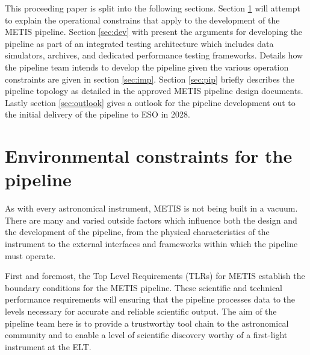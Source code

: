 \documentclass[a4paper]{spie}  %
\begin{document}
This proceeding paper is split into the following sections. Section \ref{sec:env} will attempt to explain the operational constrains that apply to the development of the METIS pipeline. Section \ref{sec:dev} with present the arguments for developing the pipeline as part of an integrated testing architecture which includes data simulators, archives, and dedicated performance testing frameworks. Details how the pipeline team intends to develop the pipeline given the various operation constraints are given in section \ref{sec:imp}. Section \ref{sec:pip} briefly describes the pipeline topology as detailed in the approved METIS pipeline design documents. Lastly section  \ref{sec:outlook} gives a outlook for the pipeline development out to the initial delivery of the pipeline to ESO in 2028.

\section{Environmental constraints for the pipeline}
\label{sec:env}


As with every astronomical instrument, METIS is not being built in a vacuum. 
There are many and varied outside factors which influence both the design and the development of the pipeline, from the physical characteristics of the instrument to the external interfaces and frameworks within which the pipeline must operate.

First and foremost, the Top Level Requirements (TLRs) for METIS \cite{ESO-257869} establish the boundary conditions for the METIS pipeline.
These scientific and technical performance requirements will ensuring that the pipeline processes data to the levels necessary for accurate and reliable scientific output. 
The aim of the pipeline team here is to provide a trustworthy tool chain to the astronomical community and to enable a level of scientific discovery worthy of a first-light instrument at the ELT. 
\end{document}
